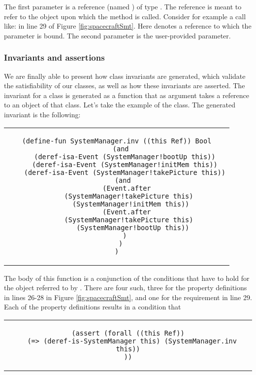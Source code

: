 The first parameter is a reference (named )
of type . The  reference is meant to 
refer to the object upon which the method is called. Consider for example a call like:  in line 29 of Figure
\ref{fig:spacecraftSmt}. Here  denotes a reference to which the parameter  is bound.
The second parameter is the user-provided parameter.

\subsubsection{Invariants and assertions}

We are finally able to present how class invariants are generated, 
which validate the satisfiability of our classes, as well as how 
these invariants are asserted. The invariant for a class is
generated as a function that as argument takes a 
reference to an object of that class. Let's take the example of the
 class. The generated invariant is the 
following:

\begin{center}
\begin{tabular}{c}
\begin{lstlisting}
(define-fun SystemManager.inv ((this Ref)) Bool
  (and
    (deref-isa-Event (SystemManager!bootUp this))
    (deref-isa-Event (SystemManager!initMem this))
    (deref-isa-Event (SystemManager!takePicture this))
    (and 
      (Event.after 
        (SystemManager!takePicture this)  
        (SystemManager!initMem this)) 
      (Event.after 
        (SystemManager!takePicture this)  
        (SystemManager!bootUp this))
    )
  )
)
\end{lstlisting}
\end{tabular}
\end{center}

The body of this function is a conjunction of the conditions
that have to hold for the  object referred to
by . There are four such, three for the property
definitions in lines 26-28 in Figure \ref{fig:spacecraftSmt},
and one for the requirement in line 29. Each of the property definitions results in a condition that 


\begin{center}
\begin{tabular}{c}
\begin{lstlisting}
(assert (forall ((this Ref))
  (=> (deref-is-SystemManager this) (SystemManager.inv this))
))
\end{lstlisting}
\end{tabular}
\end{center}

